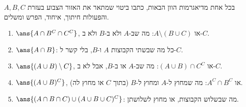 בכל אחת מדיאגרמות הוון הבאות, כתבו ביטוי שמתאר את האזור הצבוע בעזרת $A,B,C$ והפעולות חיתוך, איחוד, הפרש ומשלים.
\begin{enumerate}
\item {}
\begin{solbox}
$\ans{A\cap B^C\cap C^C}$, או $A\setminus(B\cup C)$: מה שב-$A$ ולא ב-$B$ ולא ב-$C$.
\end{solbox}
\item {}
\begin{solbox}
$\ans{A\cap B}$: כל מה שבשתי הקבוצות $A$ ו-$B$, בלי קשר ל-$C$.
\end{solbox}
\item {}
\begin{solbox}
$\ans{(A\cup B)\setminus C}$, או $(A\cup B)\cap C^C$: מה שב-$A$ או ב-$B$, אבל לא ב-$C$.
\end{solbox}
\item {}
\begin{solbox}
$\ans{(A\cup B)^C}$, או $A^C\cap B^C$: מה שמחוץ ל-$A$ ומחוץ ל-$B$ (בתוך $C$ או מחוץ לה).
\end{solbox}
\item {}
\begin{solbox}
$\ans{(A\cap B\cap C)\cup(A\cup B\cup C)^C}$: מה שבשלוש הקבוצות, או מחוץ לשלושתן.
\end{solbox}
\end{enumerate}
